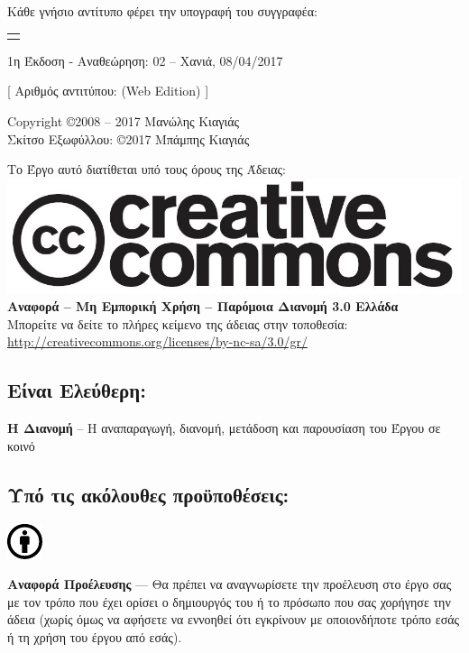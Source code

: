 %
%
\maketitle
\begin{center}
Κάθε γνήσιο αντίτυπο φέρει την υπογραφή του συγγραφέα:
\begin{tabular}{p{}}
\\
\\
\end{tabular}

\smallskip
1η Έκδοση - Αναθεώρηση: 02 -- Χανιά, 08/04/2017

[ Αριθμός αντιτύπου: (Web Edition) ]

\smallskip
Copyright \copyright 2008 -- 2017 Μανώλης Κιαγιάς\\
Σκίτσο Εξωφύλλου: \copyright 2017 Μπάμπης Κιαγιάς

Το Έργο αυτό διατίθεται υπό τους όρους της Άδειας:\\
\includegraphics[scale=0.2]{images/license/cc-logo}\\
\textbf{Αναφορά -- Μη Εμπορική Χρήση --  Παρόμοια Διανομή 3.0 Ελλάδα}\\
Μπορείτε να δείτε το πλήρες κείμενο της άδειας στην τοποθεσία:\\
\url{http://creativecommons.org/licenses/by-nc-sa/3.0/gr/}
\end{center}
\subsection*{Είναι Ελεύθερη:}

\noindent
\textbf{Η Διανομή} -- Η αναπαραγωγή, διανομή, μετάδοση και παρουσίαση του Έργου σε κοινό
\subsection*{Υπό τις ακόλουθες προϋποθέσεις:}
\vspace{1em}
\noindent
\parbox{1.5cm}{\includegraphics[scale=0.15]{images/license/cc_by_30}}
\parbox{10.5cm}{\textbf{Αναφορά Προέλευσης} — Θα πρέπει να αναγνωρίσετε την προέλευση στο έργο σας με τον τρόπο που έχει ορίσει ο δημιουργός του ή το πρόσωπο που σας χορήγησε την άδεια (χωρίς όμως να αφήσετε να εννοηθεί  ότι εγκρίνουν  με οποιονδήποτε τρόπο εσάς ή τη χρήση του έργου από εσάς).}

